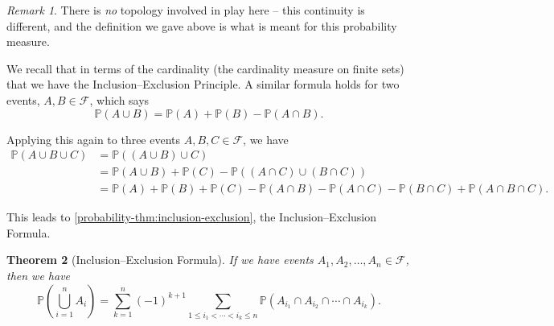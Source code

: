 \documentclass[11pt]{article}
\numberwithin{equation}{section}
\newtheorem{theorem}{Theorem}[section]
\theoremstyle{definition}
\theoremstyle{remark}
\newtheorem{remark}[theorem]{Remark}
\newcommand{\pqty}[1]{\left(#1\right)}
\newcommand{\eventSpace}{\mathcal F}
\newcommand{\Prob}{\mathbb P}
\begin{document}
\begin{remark}\label{probability-remark-002}
    There is \emph{no} topology involved in play here -- this continuity is different, and the definition we gave above is what is meant for this probability measure.
\end{remark}

We recall that in terms of the cardinality (the cardinality measure on finite sets) that we have the Inclusion--Exclusion Principle. A similar formula holds for two events, \(A, B \in \eventSpace\), which says
\[
    \Prob\pqty{A \cup B} = \Prob\pqty{A} + \Prob\pqty{B} - \Prob\pqty{A \cap B}.
\]

Applying this again to three events \(A, B, C \in \eventSpace\), we have
\begin{align*}
    \Prob\pqty{A \cup B \cup C} &=  \Prob\pqty{\pqty{A \cup B} \cup C}\\
    &= \Prob\pqty{A \cup B} + \Prob\pqty{C} - \Prob\pqty{\pqty{A \cap C} \cup \pqty{B \cap C}} \\
    &= \Prob\pqty{A} + \Prob\pqty{B} + \Prob\pqty{C} - \Prob\pqty{A \cap B} - \Prob\pqty{A \cap C} - \Prob\pqty{B \cap C} + \Prob\pqty{A \cap B \cap C}.
\end{align*}

This leads to \autoref{probability-thm:inclusion-exclusion}, the Inclusion--Exclusion Formula.

\begin{theorem}[Inclusion--Exclusion Formula]\label{probability-theorem-002}
    \label{probability-thm:inclusion-exclusion}%
    If we have events \(A_1, A_2, \ldots, A_n\in\eventSpace\), then we have
    \[
        \Prob\pqty{\bigcup_{i = 1}^{n} A_i} = \sum_{k = 1}^{n} \pqty{-1}^{k + 1} \sum_{1 \leq i_1 < \cdots < i_k \leq n} \Prob\pqty{A_{i_1} \cap A_{i_2} \cap \cdots \cap A_{i_k}}.
    \]
\end{theorem}
\end{document}

